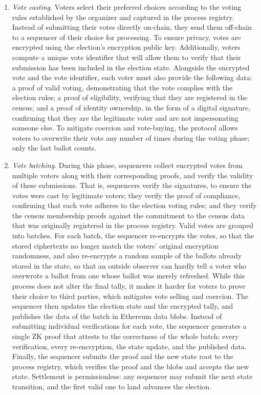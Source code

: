 \begin{enumerate}
	\begin{enumerate}
		\item \label{sec:protocol-intuition:vote-casting} \textit{Vote casting}.
		Voters select their preferred choices according to the voting rules established by the organizer and captured in the process registry. Instead of submitting their votes directly on-chain, they send them off-chain to a sequencer of their choice for processing.
		To ensure privacy, votes are encrypted using the election's encryption public key. Additionally, voters compute a unique vote identifier that will allow them to verify that their submission has been included in the election state. Alongside the encrypted vote and the vote identifier, each voter must also provide the following data: a proof of valid voting, demonstrating that the vote complies with the election rules; a proof of eligibility, verifying that they are registered in the census; and a proof of identity ownership, in the form of a digital signature, confirming that they are the legitimate voter and are not impersonating someone else. To mitigate coercion and vote-buying, the protocol allows voters to overwrite their vote any number of times during the voting phase; only the last ballot counts. \\
		\item \label{sec:protocol-intuition:vote-batching} \textit{Vote batching}.
		During this phase, sequencers collect encrypted votes from multiple voters along with their corresponding proofs, and verify the validity of these submissions. That is, sequencers
		verify the signatures, to ensure the votes were cast by legitimate voters; they verify the proof of compliance, confirming that each vote adheres to the election voting rules; and they verify the census membership proofs against the commitment to the census data that was originally registered in the process registry. Valid votes are grouped into batches. For each batch, the sequencer re-encrypts the votes, so that the stored ciphertexts no longer match the voters' original encryption randomness, and also re-encrypts a random sample of the ballots already stored in the state, so that an outside observer can hardly tell a voter who overwrote a ballot from one whose ballot was merely refreshed. While this process does not alter the final tally, it makes it harder for voters to prove their choice to third parties, which mitigates vote selling and coercion. The sequencer then updates the election state and the encrypted tally, and publishes the data of the batch in Ethereum data blobs.
		Instead of submitting individual verifications for each vote, the sequencer generates a single \ac{ZK} proof that attests to the correctness of the whole batch: every verification, every re-encryption, the state update, and the published data. Finally, the sequencer submits the proof and the new state root to the process registry, which verifies the proof and the blobs and accepts the new state. Settlement is permissionless: any sequencer may submit the next state transition, and the first valid one to land advances the election.\\
	\end{enumerate}


\end{enumerate}
